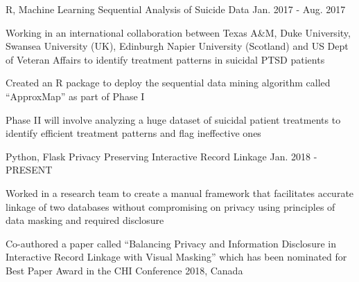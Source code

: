 

\begin{cventries}

  \cventry
    {R, Machine Learning} %
    {Sequential Analysis of Suicide Data} %
    {Jan. 2017 - Aug. 2017} %
    {} %
    {
      \begin{cvitems} %
        \item {Working in an international collaboration between Texas A\&M, Duke University, Swansea University (UK), Edinburgh Napier University (Scotland) and US Dept of Veteran Affairs to identify treatment patterns in suicidal PTSD patients}
        \item {Created an R package to deploy the sequential data mining algorithm called “ApproxMap” as part of Phase I}
        \item {Phase II will involve analyzing a huge dataset of suicidal patient treatments to identify efficient treatment patterns and flag ineffective ones}
      \end{cvitems}
    }


  \cventry
    {Python, Flask} %
    {Privacy Preserving Interactive Record Linkage} %
    {Jan. 2018 - PRESENT} %
    {} %
    {
      \begin{cvitems} %
        \item {Worked in a research team to create a manual framework that facilitates accurate linkage of two databases without compromising on privacy using principles of data masking and required disclosure}
        \item {Co-authored a paper called “Balancing Privacy and Information Disclosure in Interactive Record Linkage with Visual Masking” which has been nominated for Best Paper Award in the CHI Conference 2018, Canada}
      \end{cvitems}
    }



\end{cventries}
